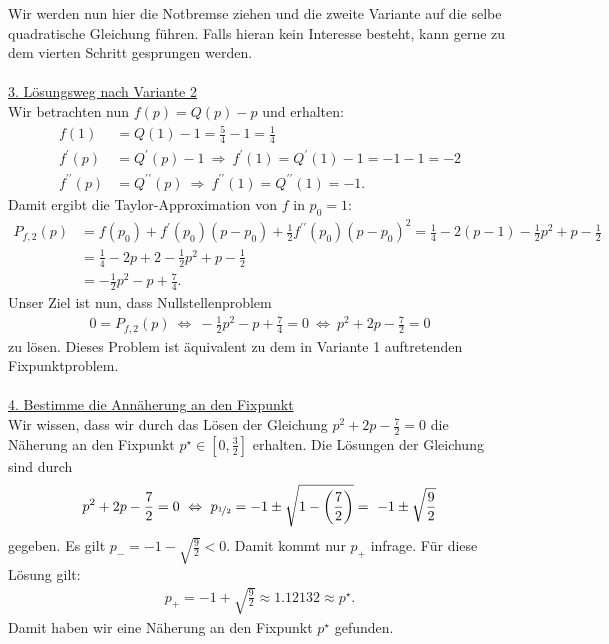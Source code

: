 Wir werden nun hier die Notbremse ziehen und die zweite Variante auf die selbe quadratische Gleichung führen. Falls hieran kein Interesse besteht, kann gerne zu dem vierten Schritt gesprungen werden.\\
\\
\underline{3. Lösungsweg nach Variante 2}\\
Wir betrachten nun $ f(p) = Q(p) - p$ und erhalten:
\begin{align*}
	f(1) &= Q(1) - 1 = \frac{5}{4} -1 = \frac{1}{4}\\
	f^\prime(p) &= Q^\prime(p) - 1 \ \Rightarrow \
	f^\prime(1) = Q^\prime(1) - 1  = - 1 - 1 = -2\\
	f^{\prime \prime }(p) &= Q^{\prime \prime}(p) \ \Rightarrow \
		f^{\prime \prime }(1) = Q^{\prime \prime}(1) = -1.
\end{align*}
Damit ergibt die Taylor-Approximation von $ f $ in $ p_0 = 1 $:
\begin{align*}
	P_{f,2}(p)
	&=
	f(p_0) + f^\prime(p_0)(p -p_0) + \frac{1}{2}f^{\prime \prime}(p_0)(p-p_0)^2
	=
	\frac{1}{4} - 2 (p -1) - \frac{1}{2} p^2 + p - \frac{1}{2}\\
	&=
	\frac{1}{4} - 2p  + 2 - \frac{1}{2} p^2 + p - \frac{1}{2}\\
	&=
	- \frac{1}{2} p^2 - p + \frac{7}{4}.
\end{align*}
Unser Ziel ist nun, dass Nullstellenproblem
\begin{align*}
	0 = P_{f,2}(p) 
	\ \Leftrightarrow \
	- \frac{1}{2} p^2 - p + \frac{7}{4} = 0
	\ \Leftrightarrow \
	 p^2 +2 p - \frac{7}{2} = 0
\end{align*}
zu lösen. Dieses Problem ist äquivalent zu dem in Variante 1 auftretenden Fixpunktproblem.\\
\\
\underline{4. Bestimme die Annäherung an den Fixpunkt}\\
Wir wissen, dass wir durch das Lösen der Gleichung $  p^2 +2 p - \frac{7}{2} = 0 $ die Näherung an den Fixpunkt $ p^\star \in \left[0,\frac{3}{2}\right] $ erhalten.
Die Lösungen der Gleichung sind durch
\begin{align*}
	p^2 +2 p - \frac{7}{2} = 0
	\ \Leftrightarrow \
	p_{\nicefrac{1}{2}} 
	=  -1 \pm \sqrt{1 - \left(\frac{7}{2}\right)}
	=
	\ -1 \pm \sqrt{\frac{9}{2}}
\end{align*}
gegeben. Es gilt $ p_{-} = -1 - \sqrt{\frac{9}{2}}  < 0  $. Damit kommt nur $ p_+  $ infrage.
Für diese Lösung gilt:
\begin{align*}
	p_+ = -1 + \sqrt{\frac{9}{2}} \approx 1.12132 \approx p^\star. 
\end{align*}
Damit haben wir eine Näherung an den Fixpunkt $ p^\star  $ gefunden.


